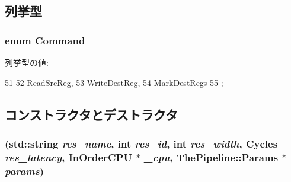 \subsection{列挙型}
\hypertarget{classUseDefUnit_a2afce0a47a93eee73a314d53e4890153}{
\subsubsection[{Command}]{\setlength{\rightskip}{0pt plus 5cm}enum {\bf Command}}}
\label{classUseDefUnit_a2afce0a47a93eee73a314d53e4890153}
\begin{Desc}
\item[列挙型の値: ]\par
\begin{description}
\item[{\em 
\hypertarget{classUseDefUnit_a2afce0a47a93eee73a314d53e4890153aaeedb0d901f76a332eff9fb2fdb42eee}{
ReadSrcReg}
\label{classUseDefUnit_a2afce0a47a93eee73a314d53e4890153aaeedb0d901f76a332eff9fb2fdb42eee}
}]\item[{\em 
\hypertarget{classUseDefUnit_a2afce0a47a93eee73a314d53e4890153aebf3627ab0dc50391abb37f1d20bc375}{
WriteDestReg}
\label{classUseDefUnit_a2afce0a47a93eee73a314d53e4890153aebf3627ab0dc50391abb37f1d20bc375}
}]\item[{\em 
\hypertarget{classUseDefUnit_a2afce0a47a93eee73a314d53e4890153aa7a98b5cc14566eda10b7248440cafa2}{
MarkDestRegs}
\label{classUseDefUnit_a2afce0a47a93eee73a314d53e4890153aa7a98b5cc14566eda10b7248440cafa2}
}]\end{description}
\end{Desc}




\begin{DoxyCode}
51                  {
52         ReadSrcReg,
53         WriteDestReg,
54         MarkDestRegs
55     };
\end{DoxyCode}


\subsection{コンストラクタとデストラクタ}
\hypertarget{classUseDefUnit_a75c5c187ebe767d923c1cb13ba91df2f}{
\subsubsection[{UseDefUnit}]{ (std::string {\em res\_\-name}, \/  int {\em res\_\-id}, \/  int {\em res\_\-width}, \/  {\bf Cycles} {\em res\_\-latency}, \/  {\bf InOrderCPU} $\ast$ {\em \_\-cpu}, \/  {\bf ThePipeline::Params} $\ast$ {\em params})}}
\label{classUseDefUnit_a75c5c187ebe767d923c1cb13ba91df2f}


